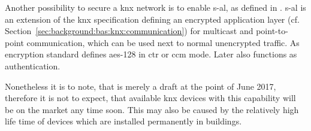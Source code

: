 Another possibility to secure a \gls{knx} network is to enable \gls{s-al}, as defined in \textcite{DIN_EN_50090-3-4}. \Gls{s-al} is an extension of the \gls{knx} specification defining an encrypted application layer (cf. Section~\ref{sec:background:bas:knx:communication}) for multicast and point-to-point communication, which can be used next to normal unencrypted traffic.
As encryption standard \textcite{DIN_EN_50090-3-4} defines \gls{aes}-128 in \gls{ctr} or \gls{ccm} mode.
Later also functions as authentication. 

Nonetheless it is to note, that \textcite{DIN_EN_50090-3-4} is merely a draft at the point of June 2017, therefore it is not to expect, that available \gls{knx} devices with this capability will be on the market any time soon. This may also be caused by the relatively high life time of devices which are installed permanently in buildings.



